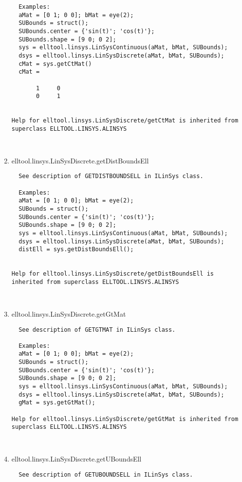 \begin{enumerate}
\begin{lstlisting}
  Examples:
  aMat = [0 1; 0 0]; bMat = eye(2);
  SUBounds = struct();
  SUBounds.center = {'sin(t)'; 'cos(t)'};
  SUBounds.shape = [9 0; 0 2];
  sys = elltool.linsys.LinSysContinuous(aMat, bMat, SUBounds);
  dsys = elltool.linsys.LinSysDiscrete(aMat, bMat, SUBounds);
  cMat = sys.getCtMat()
  cMat =

       1     0
       0     1


Help for elltool.linsys.LinSysDiscrete/getCtMat is inherited from superclass ELLTOOL.LINSYS.ALINSYS



\end{lstlisting}
\fontfamily{\familydefault}
\selectfont
\item {elltool.linsys.LinSysDiscrete.getDistBoundsEll}
\selectfont
\begin{lstlisting}
  See description of GETDISTBOUNDSELL in ILinSys class.

  Examples:
  aMat = [0 1; 0 0]; bMat = eye(2);
  SUBounds = struct();
  SUBounds.center = {'sin(t)'; 'cos(t)'};
  SUBounds.shape = [9 0; 0 2];
  sys = elltool.linsys.LinSysContinuous(aMat, bMat, SUBounds);
  dsys = elltool.linsys.LinSysDiscrete(aMat, bMat, SUBounds);
  distEll = sys.getDistBoundsEll();


Help for elltool.linsys.LinSysDiscrete/getDistBoundsEll is inherited from superclass ELLTOOL.LINSYS.ALINSYS



\end{lstlisting}
\fontfamily{\familydefault}
\selectfont
\item {elltool.linsys.LinSysDiscrete.getGtMat}
\selectfont
\begin{lstlisting}
  See description of GETGTMAT in ILinSys class.

  Examples:
  aMat = [0 1; 0 0]; bMat = eye(2);
  SUBounds = struct();
  SUBounds.center = {'sin(t)'; 'cos(t)'};
  SUBounds.shape = [9 0; 0 2];
  sys = elltool.linsys.LinSysContinuous(aMat, bMat, SUBounds);
  dsys = elltool.linsys.LinSysDiscrete(aMat, bMat, SUBounds);
  gMat = sys.getGtMat();

Help for elltool.linsys.LinSysDiscrete/getGtMat is inherited from superclass ELLTOOL.LINSYS.ALINSYS



\end{lstlisting}
\fontfamily{\familydefault}
\selectfont
\item {elltool.linsys.LinSysDiscrete.getUBoundsEll}
\selectfont
\begin{lstlisting}
  See description of GETUBOUNDSELL in ILinSys class.


\end{lstlisting}
\end{enumerate}
